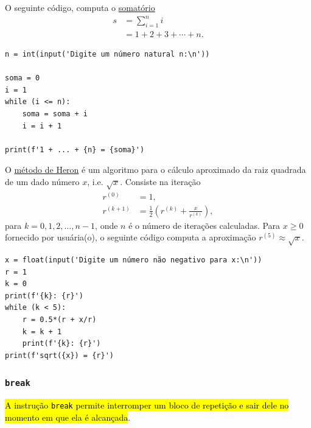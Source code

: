 \begin{ex}\label{cap_progest_ec_repete:ex:while_soma_num}
  O seguinte código, computa o \href{https://pt.wikipedia.org/wiki/Somat%C3%B3rio}{somatório}
  \begin{align}
    s &= \sum_{i=1}^{n}i\\
      &= 1 + 2 + 3 + \cdots + n.
  \end{align}

\begin{lstlisting}
n = int(input('Digite um número natural n:\n'))

soma = 0
i = 1
while (i <= n):
    soma = soma + i
    i = i + 1

print(f'1 + ... + {n} = {soma}')
\end{lstlisting}

\end{ex}

\begin{ex}\label{cap_progest_sec_repete:ex:heron}
  O \href{https://en.wikipedia.org/wiki/Methods_of_computing_square_roots#Heron's_method}{método de Heron}{\heron} é um algoritmo para o cálculo aproximado da raiz quadrada de um dado número $x$, i.e. $\sqrt{x}$. Consiste na iteração
  \begin{align}
    r^{(0)} &= 1,\\
    r^{(k+1)} &= \frac{1}{2}\left(r^{(k)} + \frac{x}{r^{(k)}}\right),
  \end{align}
  para $k=0,1,2,\ldots,n-1$, onde $n$ é o número de iterações calculadas. Para $x\geq 0$ fornecido por usuária(o), o seguinte código computa a aproximação $r^{(5)}\approx \sqrt{x}$.

\begin{lstlisting}
x = float(input('Digite um número não negativo para x:\n'))
r = 1
k = 0
print(f'{k}: {r}')
while (k < 5):
    r = 0.5*(r + x/r)
    k = k + 1
    print(f'{k}: {r}')
print(f'sqrt({x}) = {r}')
\end{lstlisting}

\end{ex}

\subsubsection{\lstinline+break+}

\hl{A instrução \texttt{break} permite interromper um bloco de repetição e sair dele no momento em que ela é alcançada}.

